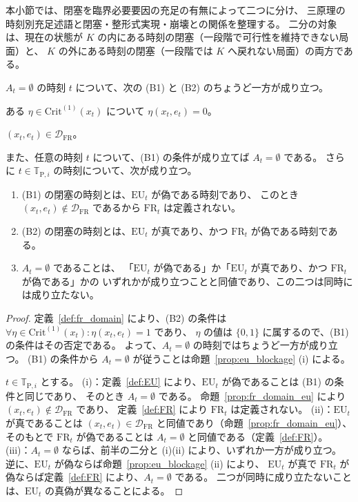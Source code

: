 本小節では、閉塞を臨界必要要因の充足の有無によって二つに分け、
三原理の時刻別充足述語と閉塞・整形式実現・崩壊との関係を整理する。
二分の対象は、現在の状態が $K$ の内にある時刻の閉塞（一段階で可行性を維持できない局面）と、
$K$ の外にある時刻の閉塞（一段階では $K$ へ戻れない局面）の両方である。

\begin{proposition}[閉塞の二分]
\label{prop:blockage_dichotomy}
$A_t=\emptyset$ の時刻 $t$ について、次の (B1) と (B2) のちょうど一方が成り立つ。
\begin{description}[style=nextline]
  \item[(B1) 臨界必要要因非充足閉塞]
  ある $\eta\in\mathrm{Crit}^{(1)}(x_t)$ について $\eta(x_t,e_t)=0$。
  \item[(B2) 臨界必要要因充足下閉塞]
  $(x_t,e_t)\in\mathcal{D}_{\mathrm{FR}}$。
\end{description}
また、任意の時刻 $t$ について、(B1) の条件が成り立てば $A_t=\emptyset$ である。
さらに $t\in\mathbb{T}_{\mathrm{P},i}$ の時刻について、次が成り立つ。
\begin{enumerate}[label=(\roman*)]
  \item (B1) の閉塞の時刻とは、$\mathrm{EU}_t$ が偽である時刻であり、
  このとき $(x_t,e_t)\notin\mathcal{D}_{\mathrm{FR}}$ であるから $\mathrm{FR}_t$ は定義されない。
  \item (B2) の閉塞の時刻とは、$\mathrm{EU}_t$ が真であり、かつ $\mathrm{FR}_t$ が偽である時刻である。
  \item $A_t=\emptyset$ であることは、
  「$\mathrm{EU}_t$ が偽である」か「$\mathrm{EU}_t$ が真であり、かつ $\mathrm{FR}_t$ が偽である」かの
  いずれかが成り立つことと同値であり、この二つは同時には成り立たない。
\end{enumerate}
\end{proposition}

\begin{proof}
定義~\ref{def:fr_domain} により、(B2) の条件は $\forall\eta\in\mathrm{Crit}^{(1)}(x_t):\eta(x_t,e_t)=1$ であり、
$\eta$ の値は $\{0,1\}$ に属するので、(B1) の条件はその否定である。
よって、$A_t=\emptyset$ の時刻ではちょうど一方が成り立つ。
(B1) の条件から $A_t=\emptyset$ が従うことは命題~\ref{prop:eu_blockage} (i) による。

$t\in\mathbb{T}_{\mathrm{P},i}$ とする。
(i)：定義~\ref{def:EU} により、$\mathrm{EU}_t$ が偽であることは (B1) の条件と同じであり、
そのとき $A_t=\emptyset$ である。
命題~\ref{prop:fr_domain_eu} により $(x_t,e_t)\notin\mathcal{D}_{\mathrm{FR}}$ であり、
定義~\ref{def:FR} により $\mathrm{FR}_t$ は定義されない。
(ii)：$\mathrm{EU}_t$ が真であることは $(x_t,e_t)\in\mathcal{D}_{\mathrm{FR}}$ と同値であり（命題~\ref{prop:fr_domain_eu}）、
そのもとで $\mathrm{FR}_t$ が偽であることは $A_t=\emptyset$ と同値である（定義~\ref{def:FR}）。
(iii)：$A_t=\emptyset$ ならば、前半の二分と (i)(ii) により、いずれか一方が成り立つ。
逆に、$\mathrm{EU}_t$ が偽ならば命題~\ref{prop:eu_blockage} (ii) により、
$\mathrm{EU}_t$ が真で $\mathrm{FR}_t$ が偽ならば定義~\ref{def:FR} により、$A_t=\emptyset$ である。
二つが同時に成り立たないことは、$\mathrm{EU}_t$ の真偽が異なることによる。
\end{proof}

